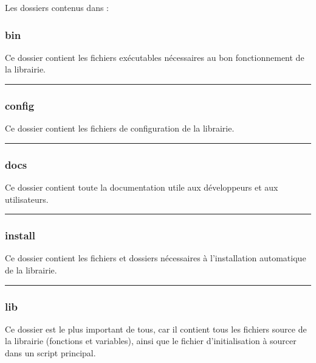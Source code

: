 \documentclass[a4paper,10pt]{article}
\begin{document}
Les dossiers contenus dans  :
\color{blue}
\subsubsection{bin}\color{white}
Ce dossier contient les fichiers exécutables nécessaires au bon fonctionnement de la librairie.\\[1\baselineskip]



\color{blue}\par\noindent\rule{\textwidth}{0.4pt}\color{white}

\color{blue}
\subsubsection{config}\color{white}
Ce dossier contient les fichiers de configuration de la librairie.\\[1\baselineskip]



\color{blue}\par\noindent\rule{\textwidth}{0.4pt}\color{white}

\color{blue}
\subsubsection{docs}\color{white}
Ce dossier contient toute la documentation utile aux développeurs et aux utilisateurs.\\[1\baselineskip]



\color{blue}\par\noindent\rule{\textwidth}{0.4pt}\color{white}

\color{blue}
\subsubsection{install}\color{white}
Ce dossier contient les fichiers et dossiers nécessaires à l'installation automatique de la librairie.\\[1\baselineskip]



\color{blue}\par\noindent\rule{\textwidth}{0.4pt}\color{white}

\color{blue}
\subsubsection{lib}\color{white}
Ce dossier est le plus important de tous, car il contient tous les fichiers source de la librairie (fonctions et variables), ainsi que le fichier d'initialisation à sourcer dans un script principal.\\[1\baselineskip]
\end{document}
